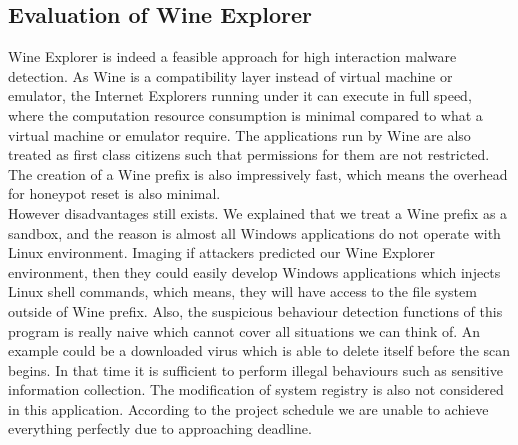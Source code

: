 \subsection{Evaluation of Wine Explorer}
Wine Explorer is indeed a feasible approach for high interaction malware 
detection. As Wine is a compatibility layer instead of virtual machine or 
emulator, the Internet Explorers running under it can execute in full speed, 
where the computation resource consumption is minimal compared to what 
a virtual machine or emulator require. The applications run by Wine are also 
treated as first class citizens such that permissions for them are not 
restricted. The creation of a Wine prefix is also impressively fast, which 
means the overhead for honeypot reset is also minimal. \\
However disadvantages still exists. We explained that we treat a Wine prefix 
as a sandbox, and the reason is almost all Windows applications do not operate 
with Linux environment. Imaging if attackers predicted our Wine Explorer 
environment, then they could easily develop Windows applications which injects 
Linux shell commands, which means, they will have access to the file system 
outside of Wine prefix. Also, the suspicious behaviour detection functions of 
this program is really naive which cannot cover all situations we can think 
of. An example could
be a downloaded virus which is able to delete itself before the scan begins. 
In that time it is sufficient to perform illegal behaviours such as sensitive 
information collection. The modification of system 
registry is also not considered in this application. According to the project 
schedule we are unable to achieve everything perfectly due to approaching 
deadline. 
